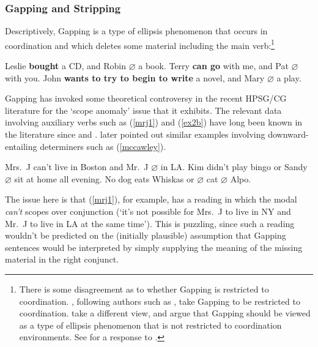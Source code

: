 \documentclass[output=paper]{langsci/langscibook}
\begin{document}
\subsubsection{Gapping and Stripping \label{sec:gapping}}

Descriptively, Gapping is a type of ellipsis phenomenon that occurs
in coordination and which deletes some material including the main
verb:\footnote{There is some disagreement as to whether Gapping is
restricted to coordination. \citet{kubota-levine-gapping}, following authors
such as \citet{johnson2009}, take Gapping to be restricted to coordination.
\citet{parkea18gapping} take a different view, and argue that Gapping
should be viewed as a type of ellipsis phenomenon that is not
restricted to coordination environments. See \citet{KubotaLevineBook}
for a  response to \citet{parkea18gapping}.}

\begin{exe}
 \ex\label{gapping}
  \begin{xlist}
 \ex\label{}
    Leslie \textbf{bought} a CD, and Robin   \ensuremath{\varnothing}  a book.
 \ex\label{}
    Terry \textbf{can go} with me, and Pat  \ensuremath{\varnothing}  with you.
 \ex\label{}
    John \textbf{wants to try to begin to write} a novel, and Mary  \ensuremath{\varnothing}  a play.
  \end{xlist}
\end{exe}
Gapping has invoked some theoretical controversy in the recent
HPSG/CG literature for the `scope anomaly' issue that it exhibits.
The relevant data involving auxiliary verbs such as (\ref{mrj1}) and (\ref{ex2b})
have long been known in the literature since
\citet{oehrle71,oehrle1987} and 
\citet{siegel87}. \citet{mccawley1993} later pointed out similar examples
involving downward-entailing determiners such as (\ref{mccawley}).

\begin{exe}
 \ex\label{scope}
  \begin{xlist}
 \ex\label{mrj1}
    Mrs.\ J can't live in Boston and Mr.\ J  \ensuremath{\varnothing}  in LA.
 \ex\label{ex2b}
    Kim didn't play bingo or Sandy  \ensuremath{\varnothing}  sit at home all evening.
 \ex\label{mccawley}
    No dog eats Whiskas or  \ensuremath{\varnothing}  cat  \ensuremath{\varnothing}  Alpo.
  \end{xlist}
\end{exe}
The issue here is that (\ref{mrj1}), for example, has a reading in
which the modal \textit{can't} scopes over conjunction (`it's not
possible for Mrs.~J to live in NY and Mr.~J to live in LA at the same
time'). This is puzzling, since such a reading wouldn't be predicted
on the (initially plausible) assumption that Gapping sentences would
be interpreted by simply supplying the meaning of the missing material
in the right conjunct.
\end{document}
